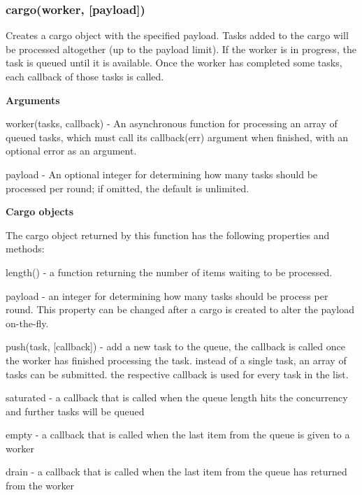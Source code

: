 \label{_cargo}%
 \subsubsection*{cargo(worker, \mbox{[}payload\mbox{]})}

Creates a cargo object with the specified payload. Tasks added to the cargo will be processed altogether (up to the payload limit). If the worker is in progress, the task is queued until it is available. Once the worker has completed some tasks, each callback of those tasks is called.

{\bfseries Arguments}


\begin{DoxyItemize}
\item worker(tasks, callback) -\/ An asynchronous function for processing an array of queued tasks, which must call its callback(err) argument when finished, with an optional error as an argument.
\item payload -\/ An optional integer for determining how many tasks should be processed per round; if omitted, the default is unlimited.
\end{DoxyItemize}

{\bfseries Cargo objects}

The cargo object returned by this function has the following properties and methods\+:


\begin{DoxyItemize}
\item length() -\/ a function returning the number of items waiting to be processed.
\item payload -\/ an integer for determining how many tasks should be process per round. This property can be changed after a cargo is created to alter the payload on-\/the-\/fly.
\item push(task, \mbox{[}callback\mbox{]}) -\/ add a new task to the queue, the callback is called once the worker has finished processing the task. instead of a single task, an array of tasks can be submitted. the respective callback is used for every task in the list.
\item saturated -\/ a callback that is called when the queue length hits the concurrency and further tasks will be queued
\item empty -\/ a callback that is called when the last item from the queue is given to a worker
\item drain -\/ a callback that is called when the last item from the queue has returned from the worker
\end{DoxyItemize}

